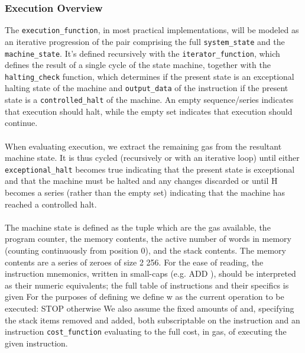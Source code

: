 \documentclass[10pt,a4paper,leqno,bibliography=totoc]{scrartcl}
\newenvironment{alphafootnotes}
{\par\edef\savedfootnotenumber{\number\value{footnote}}
\renewcommand{\thefootnote}{\alph{footnote}}
\setcounter{footnote}{0}}
{\par\setcounter{footnote}{\savedfootnotenumber}}
\begin{document}
\begin{alphafootnotes}
\begin{multicols*}{2}
				\subsubsection{Execution Overview} The \texttt{execution\_function}, in most practical implementations, will be modeled as an iterative progression of the pair comprising the full \texttt{system\_state} and the \texttt{machine\_state}. It's defined recursively with the \texttt{iterator\_function}, which defines the result of a single cycle of the state machine, together with the \texttt{halting\_check} function, which determines if the present state is an exceptional halting state of the machine and \texttt{output\_data} of the instruction if the present state is a \texttt{controlled\_halt} of the machine. An empty sequence/series indicates that execution should halt, while the empty set indicates that execution should continue.
				
				\paragraph{}When evaluating execution, we extract the remaining gas from the resultant machine state. It is thus cycled (recursively or with an iterative loop) until either \texttt{exceptional\_halt} becomes true indicating that the present state is exceptional and that the machine must be halted and any changes discarded or until H becomes a series (rather than the empty set) indicating that the machine has reached a controlled halt. 
				
				\paragraph{}The machine state  is defined as the tuple which are the gas available, the program counter, the memory contents, the active number of words in memory (counting continuously from position 0), and the stack contents. The memory contents are a series of zeroes of size 2 256. For the ease of reading, the instruction mnemonics, written in small-caps (e.g. ADD ), should be interpreted as their numeric equivalents; the full table of instructions and their specifics is given For the purposes of defining  we define w as the current operation to be executed:  STOP otherwise We also assume the fixed amounts of and, specifying the stack items removed and added, both subscriptable on the instruction and an instruction \texttt{cost\_function} evaluating to the full cost, in gas, of executing the given instruction.
				

\end{multicols*}
\end{alphafootnotes}
\end{document}
